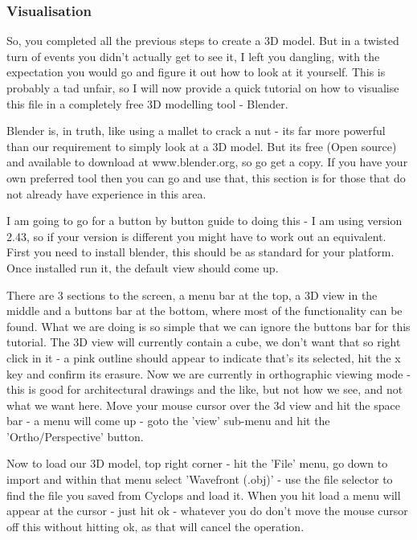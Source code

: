\documentclass[10pt,a4paper,twoside]{article}
\begin{document}
\subsubsection {Visualisation}
So, you completed all the previous steps to create a 3D model. But in a twisted turn of events you didn't actually get to see it, I left you dangling, with the expectation you would go and figure it out how to look at it yourself. This is probably a tad unfair, so I will now provide a quick tutorial on how to visualise this file in a completely free 3D modelling tool - Blender.

Blender is, in truth, like using a mallet to crack a nut - its far more powerful than our requirement to simply look at a 3D model. But its free (Open source) and available to download at www.blender.org, so go get a copy. If you have your own preferred tool then you can go and use that, this section is for those that do not already have experience in this area.

I am going to go for a button by button guide to doing this - I am using version 2.43, so if your version is different you might have to work out an equivalent. First you need to install blender, this should be as standard for your platform. Once installed run it, the default view should come up.

There are 3 sections to the screen, a menu bar at the top, a 3D view in the middle and a buttons bar at the bottom, where most of the functionality can be found. What we are doing is so simple that we can ignore the buttons bar for this tutorial. The 3D view will currently contain a cube, we don't want that so right click in it - a pink outline should appear to indicate that's its selected, hit the x key and confirm its erasure. Now we are currently in orthographic viewing mode - this is good for architectural drawings and the like, but not how we see, and not what we want here. Move your mouse cursor over the 3d view and hit the space bar - a menu will come up - goto the 'view' sub-menu and hit the 'Ortho/Perspective' button.

Now to load our 3D model, top right corner - hit the 'File' menu, go down to import and within that menu select 'Wavefront (.obj)' - use the file selector to find the file you saved from Cyclops and load it. When you hit load a menu will appear at the cursor - just hit ok - whatever you do don't move the mouse cursor off this without hitting ok, as that will cancel the operation.
\end{document}
